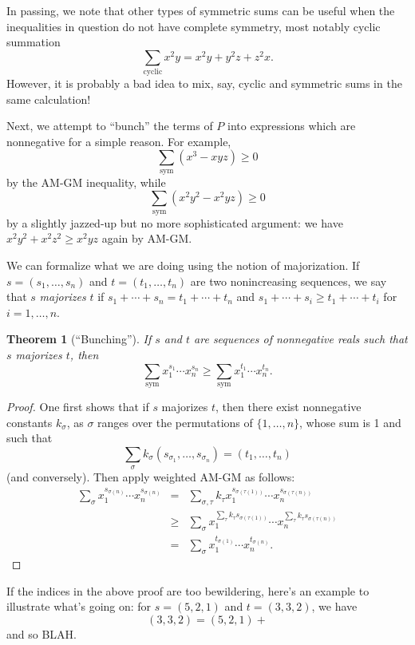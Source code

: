 \documentclass[12pt]{report}
\newtheorem{theorem}{Theorem}
\def\csum{\sum_{\mathrm{cyclic}}}
\def\ssym{\sum_{\mathrm{sym}}}
\numberwithin{exc}{section}
\begin{document}
In passing, we note that other types of symmetric sums can be useful 
when the inequalities in question do not have complete symmetry, most 
notably cyclic summation
\[
\csum x^{2}y = x^{2}y + y^{2}z + z^{2}x.
\]
However, it is probably a bad idea to mix, say, cyclic and symmetric 
sums in the same calculation!

Next, we attempt to ``bunch'' the terms of $P$ into expressions which 
are nonnegative
for a simple reason. For example, 
\[
\ssym (x^{3} - xyz) \geq 0
\]
by the AM-GM inequality, while
\[
\ssym (x^{2}y^{2} - x^{2}yz) \geq 0
\]
by a slightly jazzed-up but no more sophisticated argument: we have 
$x^{2}y^{2} + x^{2}z^{2} \geq x^{2}yz$ again by AM-GM. 

We can formalize what we are doing using the notion of majorization. 
If $s = (s_{1}, \dots, s_{n})$ and $t = (t_{1}, \dots, t_{n})$ are two 
nonincreasing sequences, we say that $s$ \emph{majorizes} $t$ if
$s_{1} + \cdots + s_{n} = t_{1} + \cdots + t_{n}$ and $s_{1} + 
\cdots + s_{i} \geq t_{1} + \cdots + t_{i}$ for $i = 1, \dots, n$. 
\begin{theorem}[``Bunching'']
If $s$ and $t$ are sequences of nonnegative reals such that $s$ 
majorizes $t$, then
\[
\ssym x_{1}^{s_{1}} \cdots x_{n}^{s_{n}} \geq \ssym x_{1}^{t_{1}} 
\cdots x_{n}^{t_{n}}.
\]
\end{theorem}
\begin{proof}
One first shows that if $s$ majorizes $t$, then there exist
nonnegative constants
$k_{\sigma}$, as $\sigma$ ranges over the permutations of $\{1, \dots,
n\}$, whose sum is 1 and such that
\[
\sum_\sigma k_{\sigma} (s_{\sigma_1}, \dots, s_{\sigma_n})
= (t_1, \dots, t_n)
\]
(and conversely). Then apply weighted AM-GM as follows:
\begin{eqnarray*}
\sum_{\sigma} x_1^{s_{\sigma(n)}} \cdots x_n^{s_{\sigma(n)}} &=&
\sum_{\sigma,\tau} k_{\tau} x_1^{s_{\sigma(\tau(1))}} \cdots 
x_n^{s_{\sigma(\tau(n))}} \\
&\geq& \sum_{\sigma} x_1^{\sum_\tau k_\tau s_{\sigma(\tau(1))}}
\cdots x_n^{\sum_\tau k_\tau s_{\sigma(\tau(n))}}\\
&=& \sum_{\sigma} x_1^{t_{\sigma(1)}} \cdots x_n^{t_{\sigma(n)}}.
\end{eqnarray*}
\end{proof}
If the indices in the above proof are too bewildering, here's an 
example to illustrate what's going on: for $s = (5,2,1)$ and $t = 
(3,3,2)$, we have
\[
(3,3,2) = (5,2,1) + 
\]
and so BLAH.

\end{document}
